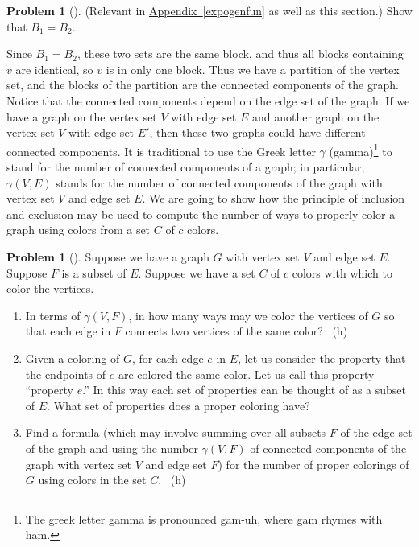 \documentclass[10pt,]{book}
\theoremstyle{plain}
\theoremstyle{definition}
\newtheorem{activity}[project]{Problem}
\theoremstyle{definition}
\numberwithin{equation}{chapter}
\begin{document}
\begin{activity}[] \label{conncomp}
\hypertarget{p-1397}{}%
(Relevant in \hyperref[expogenfun]{Appendix~\ref{expogenfun}} as well as this section.) Show that \(B_1=B_2\).%
\end{activity}
\hypertarget{p-1399}{}%
Since \(B_1=B_2\), these two sets are the same block, and thus all blocks containing \(v\) are identical, so \(v\) is in only one block. Thus we have a partition of the vertex set, and the blocks of the partition are the connected components of the graph. Notice that the connected components depend on the edge set of the graph. If we have a graph on the vertex set \(V\) with edge set \(E\) and another graph on the vertex set \(V\) with edge set \(E'\), then these two graphs could have different connected components. It is traditional to use the Greek letter \(\gamma\) (gamma)\footnote{The greek  letter gamma is pronounced gam-uh, where gam rhymes with ham.\label{fn-18}} to stand for the number of connected components of a graph; in particular, \(\gamma(V,E)\) stands for the number of connected components of the graph with vertex set \(V\) and edge set \(E\). We are going to show how the principle of inclusion and exclusion may be used to compute the number of ways to properly color a graph using colors from a set \(C\) of \(c\) colors.%
\begin{activity}[] \label{activity-242}
\hypertarget{p-1400}{}%
Suppose we have a graph \(G\) with vertex set \(V\) and edge set \(E\). Suppose \(F\) is a subset of \(E\). Suppose we have a set \(C\) of \(c\) colors with which to color the vertices.%
\begin{enumerate}[font=\bfseries,label=(\alph*),ref=\alph*]
\item\label{task-181} \marginsymbol[-2.5em]{} \hypertarget{p-1401}{}%
In terms of \(\gamma(V,F)\), in how many ways may we color the vertices of \(G\) so that each edge in \(F\) connects two vertices of the same color?%
~{\tiny (h)}\item\label{task-182} \marginsymbol[-2.5em]{} \hypertarget{p-1404}{}%
Given a coloring of \(G\), for each edge \(e\) in \(E\), let us consider the property that the endpoints of \(e\) are colored the same color.  Let us call this property ``property \(e\).''  In this way each set of properties can be thought of as a subset of \(E\).  What set of properties does a proper coloring have?%
\item\label{chromaticpoly} \marginsymbol[-2.5em]{} \hypertarget{p-1406}{}%
Find a formula (which may involve summing over all subsets \(F\) of the edge set of the graph and using the number \(\gamma(V,F)\) of connected components of the graph with vertex set \(V\) and edge set \(F\)) for the number of proper colorings of \(G\) using colors in the set \(C\).%
~{\tiny (h)}\end{enumerate}
\end{activity}
\end{document}
